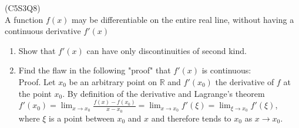 \begin{prb}
    (C5S3Q8) \\
    A function $f(x)$ may be differentiable on the entire real line, without having a continuous derivative $f'(x)$
    \begin{enumerate}
        \item[a)] Show that $f'(x)$ can have only discontinuities of second kind.
        \item[b)] Find the flaw in the following "proof" that $f'(x)$ is continuous: \\
        Proof. Let $x_0$ be an arbitrary point on $\mathbb{R}$ and $f'(x_0)$ the derivative of $f$ at the point $x_0$. By definition of the derivative and Lagrange's theorem
        $f'(x_0) = \lim_{x \to x_0} \frac{f(x) - f(x_0)}{x - x_0} = \lim_{x \to x_0} f'(\xi) = \lim_{\xi \to x_0} f'(\xi)$,
        where $\xi$ is a point between $x_0$ and $x$ and therefore tends to $x_0$ as $x \to x_0$.
    \end{enumerate}
\end{prb}

